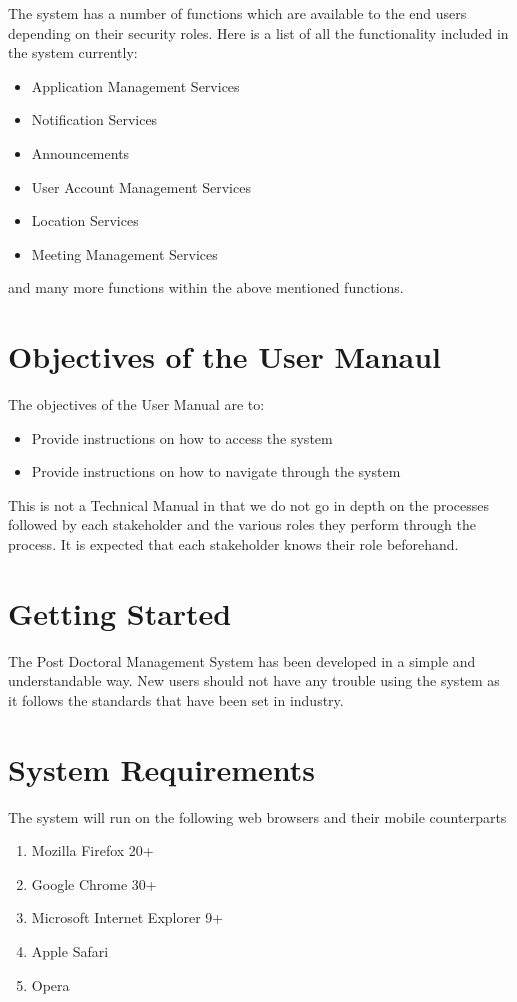 \documentclass[12pt]{article}
\begin{document}
The system has a number of functions which are available to the end users depending on their security roles. Here is a list of all the functionality included in the system currently:
\begin{itemize}
\item Application Management Services
\item Notification Services
\item Announcements
\item User Account Management Services
\item Location Services
\item Meeting Management Services
\end{itemize}

and many more functions within the above mentioned functions.

\section{Objectives of the User Manaul}
The objectives of the User Manual are to:
\begin{itemize}
\item Provide instructions on how to access the system
\item Provide instructions on how to navigate through the system
\end{itemize}
This is not a Technical Manual in that we do not go in depth on the processes followed by each stakeholder and the various roles they perform through the process. It is expected that each stakeholder knows their role beforehand.

\newpage
\section{Getting Started}
The Post Doctoral Management System has been developed in a simple and understandable way. New users should not have any trouble using the system as it follows the standards that have been set in industry.

\section{System Requirements}
The system will run on the following web browsers and their mobile counterparts
\begin{enumerate}
\item Mozilla Firefox 20+
\item Google Chrome 30+
\item Microsoft Internet Explorer 9+
\item Apple Safari
\item Opera
\end{enumerate}
\end{document}
